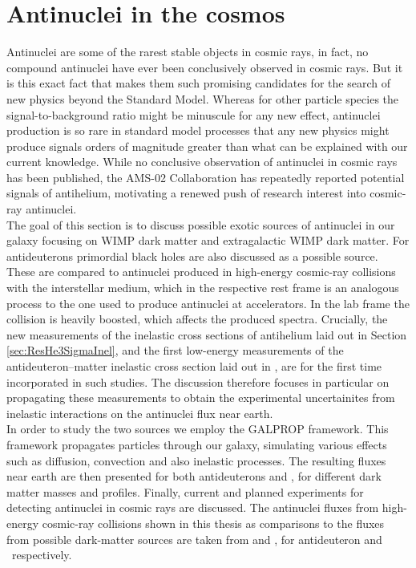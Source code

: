 \section{Antinuclei in the cosmos}\label{sec:AntinucleiInTheCosmos}
Antinuclei are some of the rarest stable objects in cosmic rays, in fact, no compound antinuclei have ever been conclusively observed in cosmic rays. But it is this exact fact that makes them such promising candidates for the search of new physics beyond the Standard Model. Whereas for other particle species the signal-to-background ratio might be minuscule for any new effect, antinuclei production is so rare in standard model processes that any new physics might produce signals orders of magnitude greater than what can be explained with our current knowledge. While no conclusive observation of antinuclei in cosmic rays has been published, the AMS-02 Collaboration has repeatedly reported potential signals of antihelium\cite{}, motivating a renewed push of research interest into cosmic-ray antinuclei. \\
The goal of this section is to discuss possible exotic sources of antinuclei in our galaxy focusing on WIMP dark matter and extragalactic WIMP dark matter. For antideuterons primordial black holes are also discussed as a possible source. These are compared to antinuclei produced in high-energy cosmic-ray collisions with the interstellar medium, which in the respective rest frame is an analogous process to the one used to produce antinuclei at accelerators. In the lab frame the collision is heavily boosted, which affects the produced spectra. Crucially, the new measurements of the inelastic cross sections of antihelium laid out in Section \ref{sec:ResHe3SigmaInel}, and the first low-energy measurements of the antideuteron--matter inelastic cross section laid out in \cite{antideuteronXS}, are for the first time incorporated in such studies. The discussion therefore focuses in particular on propagating these measurements to obtain the experimental uncertainites from inelastic interactions on the antinuclei flux near earth.\\
In order to study the two sources we employ the GALPROP framework\cite{}. This framework propagates particles through our galaxy, simulating various effects such as diffusion, convection and also inelastic processes. The resulting fluxes near earth are then presented for both antideuterons and \ahe, for different dark matter masses and profiles. Finally, current and planned experiments for detecting antinuclei in cosmic rays are discussed. 
The antinuclei fluxes from high-energy cosmic-ray collisions shown in this thesis as comparisons to the fluxes from possible dark-matter sources are taken from \cite{dbar_prop} and \cite{ALICE-PUBLIC-2022-001}, for antideuteron and \ahe\ respectively.


